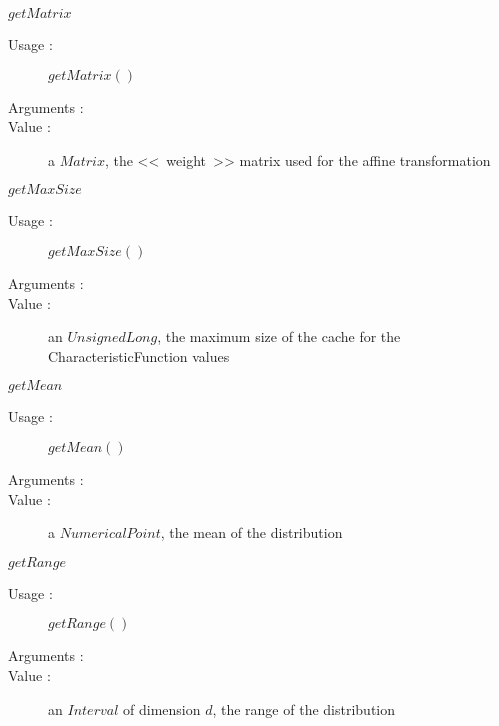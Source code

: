 \begin{description}
\begin{description}
  \item $getMatrix$
    \begin{description}
    \item[Usage :]  $getMatrix()$
    \item[Arguments :]  \strut
    \item[Value :] a $Matrix$, the <<~weight~>> matrix used for the affine transformation
    \end{description}

  \item $getMaxSize$
    \begin{description}
    \item[Usage :]  $getMaxSize()$
    \item[Arguments :]  \strut
    \item[Value :] an $UnsignedLong$, the maximum size of the cache for the CharacteristicFunction values
    \end{description}

  \item $getMean$
    \begin{description}
    \item[Usage :]  $getMean()$
    \item[Arguments :]  \strut
    \item[Value :] a $NumericalPoint$, the mean of the distribution
    \end{description}

  \item $getRange$
    \begin{description}
    \item[Usage :]  $getRange()$
    \item[Arguments :]  \strut
    \item[Value :] an $Interval$ of dimension $d$, the range of the distribution
    \end{description}


\end{description}
\end{description}
